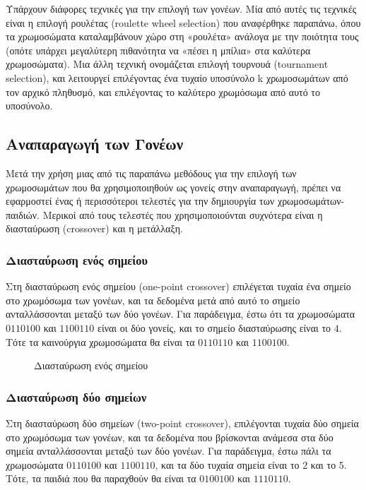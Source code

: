 Υπάρχουν διάφορες τεχνικές για την επιλογή των γονέων. Μία από αυτές τις τεχνικές είναι η επιλογή ρουλέτας (roulette wheel selection) που αναφέρθηκε παραπάνω, όπου τα χρωμοσώματα καταλαμβάνουν χώρο στη «ρουλέτα» ανάλογα με την ποιότητα τους (οπότε υπάρχει μεγαλύτερη πιθανότητα να «πέσει η μπίλια» στα καλύτερα χρωμοσώματα). Μια άλλη τεχνική ονομάζεται επιλογή τουρνουά (tournament selection), και λειτουργεί επιλέγοντας ένα τυχαίο υποσύνολο k χρωμοσωμάτων από τον αρχικό πληθυσμό, και επιλέγοντας το καλύτερο χρωμόσωμα από αυτό το υποσύνολο.

\subsection{Αναπαραγωγή των Γονέων}

Μετά την χρήση μιας από τις παραπάνω μεθόδους για την επιλογή των χρωμοσωμάτων που θα χρησιμοποιηθούν ως γονείς στην αναπαραγωγή, πρέπει να εφαρμοστεί ένας ή περισσότεροι τελεστές για την δημιουργία των χρωμοσωμάτων-παιδιών. Μερικοί από τους τελεστές που χρησιμοποιούνται συχνότερα είναι η διασταύρωση (crossover) και η μετάλλαξη.

\subsubsection{Διασταύρωση ενός σημείου}

Στη διασταύρωση ενός σημείου (one-point crossover) επιλέγεται τυχαία ένα σημείο στο χρωμόσωμα των γονέων, και τα δεδομένα μετά από αυτό το σημείο ανταλλάσσονται μεταξύ των δύο γονέων. Για παράδειγμα, έστω ότι τα χρωμοσώματα $0110100$ και $1100110$ είναι οι δύο γονείς, και το σημείο διασταύρωσης είναι το $4$. Τότε τα καινούργια χρωμοσώματα θα είναι τα $0110110$ και $1100100$.

\begin{figure}[!t]
    \centering
    \def\svgwidth{2.5in}
    
    \caption{Διασταύρωση ενός σημείου \cite{opc_fig}}
    \label{fig_opc}
\end{figure}

\subsubsection{Διασταύρωση δύο σημείων}

Στη διασταύρωση δύο σημείων (two-point crossover), επιλέγονται τυχαία δύο σημεία στο χρωμόσωμα των γονέων, και τα δεδομένα που βρίσκονται ανάμεσα στα δύο σημεία ανταλλάσσονται μεταξύ των δύο γονέων. Για παράδειγμα, έστω πάλι τα χρωμοσώματα $0110100$ και $1100110$, και τα δύο τυχαία σημεία είναι το 2 και το 5. Τότε, τα παιδιά που θα παραχθούν θα είναι τα $0100100$ και $1110110$.

